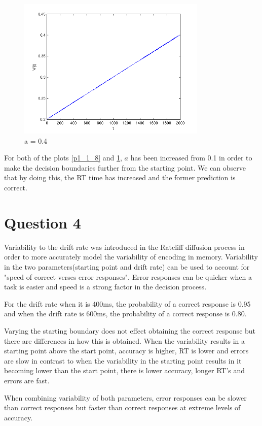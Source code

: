 \documentclass[11pt, twocolumn]{report}
\begin{document}
\begin{figure}[H]
\centering
\includegraphics[width=90mm]{assignment2_images/p1_3_4a.png}
\caption{a = 0.4}
\label{p1_1_7}
\end{figure}

For both of the plots \ref{p1_1_8} and \ref{p1_1_7}, $a$ has been increased from 0.1 in order to make the decision boundaries further from the starting point. We can observe that by doing this, the RT time has increased and the former prediction is correct. 

\section{Question 4}
Variability to the drift rate was introduced in the Ratcliff diffusion process in order to more accurately model the variability of encoding in memory\cite{ratclif}. Variability in the two parameters(starting point and drift rate) can be used to account for "speed of correct verses error responses". Error responses can be quicker when a task is easier and speed is a strong factor in the decision process. 

For the drift rate when it is 400ms, the probability of a correct response is 0.95 and when the drift rate is 600ms, the probability of a correct response is 0.80. 

Varying the starting boundary does not effect obtaining the correct response but there are differences in how this is obtained. When the variability results in a starting point above the start point, accuracy is higher, RT is lower and errors are slow in contrast to when the variability in the starting point results in it becoming lower than the start point, there is lower accuracy, longer RT's and errors are fast. 

When combining variability of both parameters, error responses can be slower than correct responses but faster than correct responses at extreme levels of accuracy. 
\end{document}
